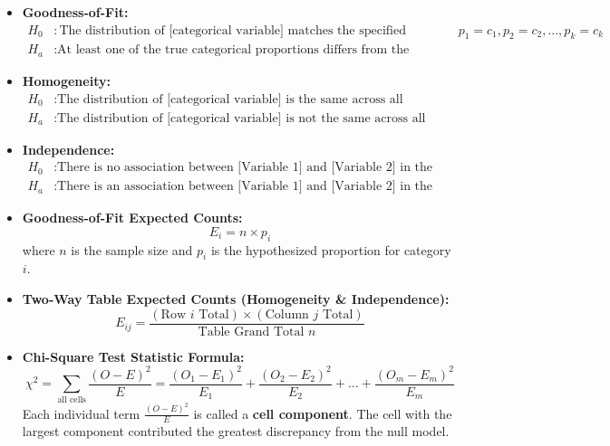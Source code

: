 \begin{lessonbox}
\begin{itemize}[leftmargin=1.2em]
  \item \textbf{Goodness-of-Fit:}
  \begin{align*}
    H_0 &: \text{The distribution of [categorical variable] matches the specified probabilities: } p_1 = c_1, p_2 = c_2, \dots, p_k = c_k \\
    H_a &: \text{At least one of the true categorical proportions differs from the specified distribution.}
  \end{align*}
  \item \textbf{Homogeneity:}
  \begin{align*}
    H_0 &: \text{The distribution of [categorical variable] is the same across all [groups/populations].} \\
    H_a &: \text{The distribution of [categorical variable] is not the same across all [groups/populations].}
  \end{align*}
  \item \textbf{Independence:}
  \begin{align*}
    H_0 &: \text{There is no association between [Variable 1] and [Variable 2] in the population (they are independent).} \\
    H_a &: \text{There is an association between [Variable 1] and [Variable 2] in the population (they are not independent).}
  \end{align*}
\end{itemize}
\end{lessonbox}

\begin{lessonbox}
\begin{itemize}[leftmargin=1.2em]
  \item \textbf{Goodness-of-Fit Expected Counts:}
  \begin{equation}
    E_i = n \times p_i
  \end{equation}
  where $n$ is the sample size and $p_i$ is the hypothesized proportion for category $i$.
  \item \textbf{Two-Way Table Expected Counts (Homogeneity \& Independence):}
  \begin{equation}
    E_{ij} = \frac{(\text{Row } i \text{ Total}) \times (\text{Column } j \text{ Total})}{\text{Table Grand Total } n}
  \end{equation}
  \item \textbf{Chi-Square Test Statistic Formula:}
  \begin{equation}
    \chi^2 = \sum_{\text{all cells}} \frac{(O - E)^2}{E} = \frac{(O_1 - E_1)^2}{E_1} + \frac{(O_2 - E_2)^2}{E_2} + \dots + \frac{(O_m - E_m)^2}{E_m}
  \end{equation}
  Each individual term $\frac{(O - E)^2}{E}$ is called a \textbf{cell component}. The cell with the largest component contributed the greatest discrepancy from the null model.
\end{itemize}
\end{lessonbox}

